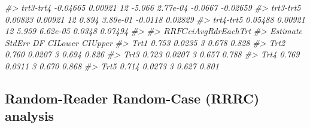 \documentclass[
]{book}
\newenvironment{Shaded}{\begin{snugshade}}{\end{snugshade}}
\newcommand{\CommentTok}[1]{\textcolor[rgb]{0.56,0.35,0.01}{\textit{#1}}}
\begin{document}
\begin{Shaded}
\begin{Highlighting}[]
\CommentTok{#> trt3-trt4 -0.04665 0.00921 12 -5.066 2.77e-04 -0.0667 -0.02659}
\CommentTok{#> trt3-trt5  0.00823 0.00921 12  0.894 3.89e-01 -0.0118  0.02829}
\CommentTok{#> trt4-trt5  0.05488 0.00921 12  5.959 6.62e-05  0.0348  0.07494}
\CommentTok{#> }
\CommentTok{#> $RRFC$ciAvgRdrEachTrt}
\CommentTok{#>      Estimate StdErr DF CILower CIUpper}
\CommentTok{#> Trt1    0.753 0.0235  3   0.678   0.828}
\CommentTok{#> Trt2    0.760 0.0207  3   0.694   0.826}
\CommentTok{#> Trt3    0.723 0.0207  3   0.657   0.788}
\CommentTok{#> Trt4    0.769 0.0311  3   0.670   0.868}
\CommentTok{#> Trt5    0.714 0.0273  3   0.627   0.801}
\end{Highlighting}
\end{Shaded}

\hypertarget{or-applications-RRRC-dataset04-FROC}{%
\subsection{Random-Reader Random-Case (RRRC) analysis}\label{or-applications-RRRC-dataset04-FROC}}
\end{document}
